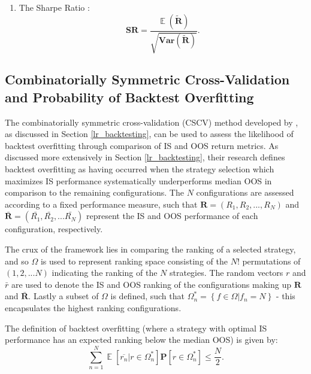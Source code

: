 \documentclass[a4paper,11pt,oneside]{article}
\newcommand{\Var}{\mathbf{Var}}
\DeclareMathOperator*{\E}{\mathbb{E}}
\theoremstyle{plain}
\theoremstyle{definition}
\begin{document}
\begin{enumerate}
			\item The Sharpe Ratio \citep{Lo}:
				\begin{equation}\label{eq_sharperatio}
					\mathbf{SR} = \frac{\mathbf{\E}(\mathbf{\tilde{R}})}{\sqrt{\Var(\mathbf{\tilde{R}})}} .
				\end{equation}
		
	\end{enumerate}
	\hfill\break

	\subsection{Combinatorially Symmetric Cross-Validation and Probability of Backtest Overfitting}\label{imp_cscv}
	
	The  combinatorially symmetric cross-validation (CSCV) method developed by \citet{BailyPBO}, as discussed in Section \ref{lr_backtesting}, can be used to assess the likelihood of backtest overfitting through comparison of IS and OOS return metrics. As discussed more extensively in Section \ref{lr_backtesting}, their research defines backtest overfitting as having occurred when the strategy selection which maximizes IS performance systematically underperforms median OOS in comparison to the remaining configurations. The $N$  configurations are assessed according to a fixed performance measure, such that $\mathbf{R} = (R_1, R_2, ..., R_N)$ and $\mathbf{\bar{R}} = (\bar{R_1}, \bar{R_2},... \bar{R_N})$ represent the IS and OOS performance of each configuration, respectively. \newline
	
	The crux of the framework lies in comparing the ranking of a selected strategy, and so $\Omega$ is used to represent ranking space consisting of the $N!$ permutations of $(1,2,...N)$ indicating the ranking of the $N$ strategies. The random vectors $r$ and $\bar{r}$ are used to denote the IS and OOS ranking of the configurations making up $\mathbf{R}$ and $\mathbf{\bar{R}}$. Lastly a subset of $\Omega$ is defined, such that $\Omega_{n}^{*}=\left\{f \in \Omega | f_{n}=N\right\}$ - this encapsulates the highest ranking configurations. \newline
	
	
	The definition of backtest overfitting (where a strategy with optimal IS performance has an expected ranking below the median OOS) is given by:
	\begin{equation}\label{eq:PBO1}
	\sum_{n=1}^{N}\mathbf{\E}[\overline{r_n}|r\in 
	\Omega_{n}^{*}]\mathbf{P}[r\in\Omega_{n}^{*}]\leq{\frac{N}{2}} .
	\end{equation}
	
\end{document}
